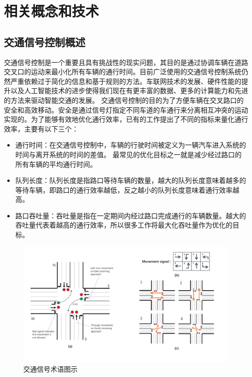 
\chapter{相关概念和技术}
\section{交通信号控制概述}
交通信号控制是一个重要且具有挑战性的现实问题，其目的是通过协调车辆在道路交叉口的运动来最小化所有车辆的通行时间。目前广泛使用的交通信号控制系统仍然严重依赖过于简化的信息和基于规则的方法。车联网技术的发展、硬件性能的提升以及人工智能技术的进步使得我们现在有更丰富的数据、更多的计算能力和先进的方法来驱动智能交通的发展。 
交通信号控制的目的为了方便车辆在交叉路口的安全和高效移动。安全是通过信号灯指定不同车道的车通行来分离相互冲突的运动实现的。为了能够有效地优化通行效率，已有的工作提出了不同的指标来量化通行效率，主要有以下三个：
\begin{itemize}
    \item 通行时间：在交通信号控制中，车辆的行驶时间被定义为一辆汽车进入系统的时间与离开系统的时间的差值。 最常见的优化目标之一就是减少经过路口的所有车辆的平均通行时间。
    \item 队列长度：队列长度是指路口等待车辆的数量，越大的队列长度意味着越多的等待车辆，即路口的通行效率越低，反之越小的队列长度意味着通行效率越高。
    \item 路口吞吐量：吞吐量是指在一定期间内经过路口完成通行的车辆数量。越大的吞吐量代表着越高的通行效率，所以很多工作将最大化吞吐量作为优化的目标。
\end{itemize}

\begin{figure}[htb]
    \includegraphics[width=.9\textwidth]{fig/tsc.pdf}
    \caption{交通信号术语图示}
    \label{fig:tsc}
\end{figure}
